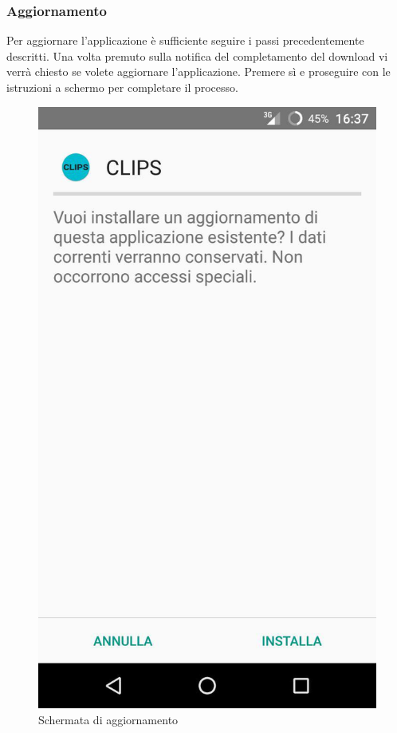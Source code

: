 \subsubsection{Aggiornamento}

Per aggiornare l'applicazione è sufficiente seguire i passi precedentemente descritti. Una volta premuto sulla notifica del completamento del download vi verrà chiesto se volete aggiornare l'applicazione. Premere sì e proseguire con le istruzioni a schermo per completare il processo.

\begin{figure}[!h]
	\centering
	\includegraphics[scale=0.15]{screenshot/aggiorna}
	\caption{Schermata di aggiornamento}
\end{figure}